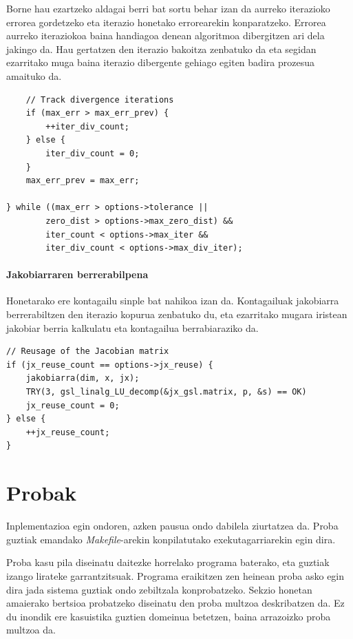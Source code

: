 \documentclass[10pt,a4paper,basque]{article}
\begin{document}
Borne hau ezartzeko aldagai berri bat sortu behar izan da aurreko iterazioko errorea gordetzeko eta iterazio honetako errorearekin konparatzeko. Errorea aurreko iteraziokoa baina handiagoa denean algoritmoa dibergitzen ari dela jakingo da. Hau gertatzen den iterazio bakoitza zenbatuko da eta segidan ezarritako muga baina iterazio dibergente gehiago egiten badira prozesua amaituko da.

\begin{lstlisting}
	// Track divergence iterations
	if (max_err > max_err_prev) {
		++iter_div_count;
	} else {
		iter_div_count = 0;
	}
	max_err_prev = max_err;

} while ((max_err > options->tolerance ||
		zero_dist > options->max_zero_dist) &&
		iter_count < options->max_iter &&
		iter_div_count < options->max_div_iter);
\end{lstlisting}

\paragraph{Jakobiarraren berrerabilpena}

Honetarako ere kontagailu sinple bat nahikoa izan da. Kontagailuak jakobiarra berrerabiltzen den iterazio kopurua zenbatuko du, eta ezarritako mugara iristean jakobiar berria kalkulatu eta kontagailua berrabiaraziko da.

\begin{lstlisting}
// Reusage of the Jacobian matrix
if (jx_reuse_count == options->jx_reuse) {
	jakobiarra(dim, x, jx);
	TRY(3, gsl_linalg_LU_decomp(&jx_gsl.matrix, p, &s) == OK)
	jx_reuse_count = 0;
} else {
	++jx_reuse_count;
}
\end{lstlisting}

\section{Probak}

Inplementazioa egin ondoren, azken pausua ondo dabilela ziurtatzea da. Proba guztiak emandako \emph{Makefile}-arekin konpilatutako exekutagarriarekin egin dira.

Proba kasu pila diseinatu daitezke horrelako programa baterako, eta guztiak izango lirateke garrantzitsuak. Programa eraikitzen zen heinean proba asko egin dira jada sistema guztiak ondo zebiltzala konprobatzeko. Sekzio honetan amaierako bertsioa probatzeko diseinatu den proba multzoa deskribatzen da. Ez du inondik ere kasuistika guztien domeinua betetzen, baina arrazoizko proba multzoa da.
\end{document}
